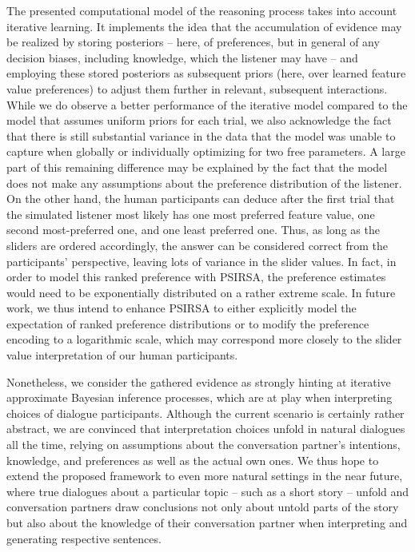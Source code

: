 \documentclass[10pt,a4paper]{article}
\begin{document}
The presented computational model of the reasoning process takes into account iterative learning. It implements the idea that the accumulation of evidence may be realized by storing posteriors -- here, of preferences, but in general of any decision biases, including knowledge, which the listener may have -- and employing these stored posteriors as subsequent priors (here, over learned feature value preferences) to adjust them further in relevant, subsequent interactions. While we do observe a better performance of the iterative model compared to the model that assumes uniform priors for each trial, we also acknowledge the fact that there is still substantial variance in the data that the model was unable to capture when globally or individually optimizing for two free parameters. 
A large part of this remaining difference may be explained by the fact that the model does not make any assumptions about the preference distribution of the listener. 
On the other hand, the human participants can deduce after the first trial that the simulated listener most likely has one most preferred feature value, one second most-preferred one, and one least preferred one. 
Thus, as long as the sliders are ordered accordingly, the answer can be considered correct from the participants' perspective, leaving lots of variance in the slider values. 
In fact, in order to model this ranked preference with PSIRSA, the preference estimates would need to be exponentially distributed on a rather extreme scale.
In future work, we thus intend to enhance PSIRSA to either explicitly model the expectation of ranked preference distributions or to modify the preference encoding to a logarithmic scale, which may correspond more closely to the slider value interpretation of our human participants. 

Nonetheless, we consider the gathered evidence as strongly hinting at iterative approximate Bayesian inference processes, which are at play when interpreting choices of dialogue participants. 
Although the current scenario is certainly rather abstract, we are convinced that interpretation choices unfold in natural dialogues all the time, relying on assumptions about the conversation partner's intentions, knowledge, and preferences as well as the actual own ones. 
We thus hope to extend the proposed framework to even more natural settings in the near future, where true dialogues about a particular topic -- such as a short story -- unfold and conversation partners draw conclusions not only about untold parts of the story but also about the knowledge of their conversation partner when interpreting and generating respective sentences.
\end{document}
